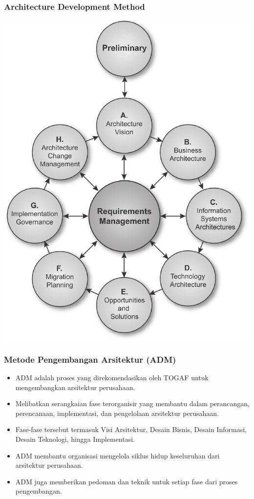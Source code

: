 \documentclass{beamer}
\begin{document}
		{
		\begin{frame}
			\frametitle{Architecture Development Method}
			\begin{center}
				\includegraphics[width=.58\textwidth]{../figures/architecture_development_method}
			\end{center}
		\end{frame}
	}
	
	\begin{frame}
		\frametitle{Metode Pengembangan Arsitektur (ADM)}
		\begin{itemize}
			\item ADM adalah proses yang direkomendasikan oleh TOGAF untuk mengembangkan arsitektur perusahaan.
			\item Melibatkan serangkaian fase terorganisir yang membantu dalam perancangan, perencanaan, implementasi, dan pengelolaan arsitektur perusahaan.
			\item Fase-fase tersebut termasuk Visi Arsitektur, Desain Bisnis, Desain Informasi, Desain Teknologi, hingga Implementasi.
			\item ADM membantu organisasi mengelola siklus hidup keseluruhan dari arsitektur perusahaan.
			\item ADM juga memberikan pedoman dan teknik untuk setiap fase dari proses pengembangan.
		\end{itemize}
	\end{frame}
	
	
	
\end{document}
